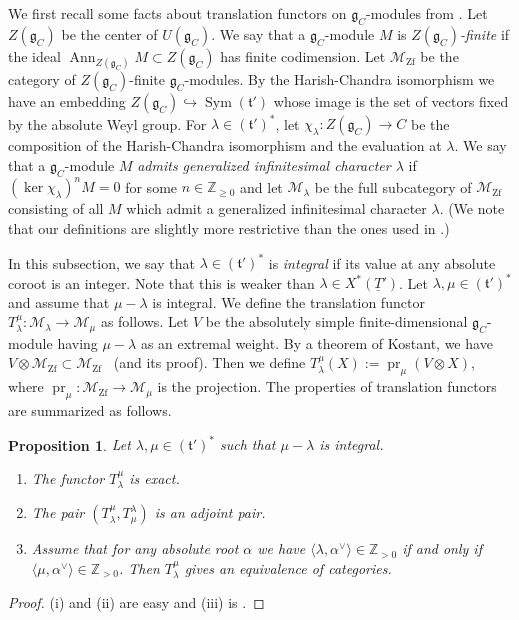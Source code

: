 \documentclass[a4paper]{amsart}
\numberwithin{equation}{section}
\newtheorem{prop}[thm]{Proposition}
\theoremstyle{remark}
\theoremstyle{definition}
\DeclareMathOperator{\pr}{pr}
\DeclareMathOperator{\Ann}{Ann}
\newcommand{\Z}{\mathbb{Z}}
\DeclareMathOperator{\Sym}{Sym}
\newcommand{\alggrp}[1]{\underline{#1}}
\begin{document}
We first recall some facts about translation functors on $\mathfrak{g}_{C}$-modules from \cite{MR581584}.
Let $Z(\mathfrak{g}_{C})$ be the center of $U(\mathfrak{g}_{C})$.
We say that a $\mathfrak{g}_{C}$-module $M$ is \emph{$Z(\mathfrak{g}_{C})$-finite} if the ideal $\Ann_{Z(\mathfrak{g}_{C})}M\subset Z(\mathfrak{g}_{C})$ has finite codimension.
Let $\mathcal{M}_{\mathrm{Zf}}$ be the category of $Z(\mathfrak{g}_{C})$-finite $\mathfrak{g}_{C}$-modules.
By the Harish-Chandra isomorphism we have an embedding $Z(\mathfrak{g}_{C})\hookrightarrow \Sym(\mathfrak{t}')$ whose image is the set of vectors fixed by the absolute Weyl group.
For $\lambda\in (\mathfrak{t}')^{*}$, let $\chi_{\lambda}\colon Z(\mathfrak{g}_{C})\to C$ be the composition of the Harish-Chandra isomorphism and the evaluation at $\lambda$.
We say that a $\mathfrak{g}_C$-module $M$ \emph{admits generalized infinitesimal character $\lambda$} if $(\ker\chi_{\lambda})^{n}M = 0$ for some $n\in\Z_{\ge0}$ and let $\mathcal{M}_{\lambda}$ be the full subcategory of $\mathcal{M}_{\mathrm{Zf}}$ consisting of all $M$ which admit a generalized infinitesimal character $\lambda$.
(We note that our definitions are slightly more restrictive than the ones used in \cite{MR581584}.)


In this subsection, we say that $\lambda\in (\mathfrak{t}')^{*}$ is \emph{integral} if its value at any absolute coroot is an integer.
Note that this is weaker than $\lambda\in X^{*}(\alggrp T')$.
Let $\lambda,\mu\in (\mathfrak{t}')^{*}$ and assume that $\mu - \lambda$ is integral.
We define the translation functor $T_{\lambda}^{\mu}\colon \mathcal{M}_{\lambda}\to \mathcal{M}_{\mu}$ as follows.
Let $V$ be the absolutely simple finite-dimensional $\mathfrak{g}_{C}$-module having $\mu - \lambda$ as an extremal weight.
By a theorem of Kostant, we have $V\otimes \mathcal{M}_{\mathrm{Zf}}\subset \mathcal{M}_{\mathrm{Zf}}$~\cite[2.6 Corollary]{MR581584} (and its proof).
Then we define $T_{\lambda}^{\mu}(X) := \pr_{\mu}(V\otimes X)$, where $\pr_{\mu}\colon \mathcal{M}_{\mathrm{Zf}}\to \mathcal{M}_{\mu}$ is the projection.
The properties of translation functors are summarized as follows.
\begin{prop}\label{prop:translation functors(algebraic)}
Let $\lambda,\mu\in (\mathfrak{t}')^{*}$ such that $\mu - \lambda$ is integral.
\begin{enumerate}
\item The functor $T_{\lambda}^{\mu}$ is exact.
\item The pair $(T_{\lambda}^{\mu},T_{\mu}^{\lambda})$ is an adjoint pair.
\item Assume that for any absolute root $\alpha$ we have $\langle \lambda,\alpha^{\vee}\rangle \in\Z_{>0}$ if and only if $\langle\mu,\alpha^{\vee}\rangle \in\Z_{>0}$. Then $T_{\lambda}^{\mu}$ gives an equivalence of categories.
\end{enumerate}
\end{prop}
\begin{proof}
(i) and (ii) are easy and (iii) is \cite[4.1~Theorem]{MR581584}.
\end{proof}
\end{document}
